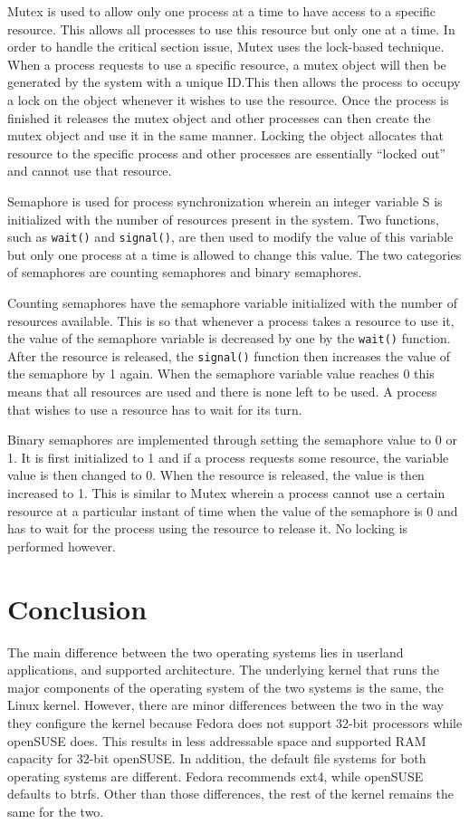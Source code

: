 \documentclass{article}
\begin{document}
Mutex is used to allow only one process at a time to have access to a specific
resource. This allows all processes to use this resource but only one at a time.
In order to handle the critical section issue, Mutex uses the lock-based
technique. When a process requests to use a specific resource, a mutex object
will then be generated by the system with a unique ID.\@ This then allows the
process to occupy a lock on the object whenever it wishes to use the resource.
Once the process is finished it releases the mutex object and other processes
can then create the mutex object and use it in the same manner. Locking the
object allocates that resource to the specific process and other processes are
essentially “locked out” and cannot use that resource.

Semaphore is used for process synchronization wherein an integer variable S is
initialized with the number of resources present in the system. Two functions,
such as \texttt{wait()} and \texttt{signal()}, are then used to modify the value
of this variable but only one process at a time is allowed to change this value.
The two categories of semaphores are counting semaphores and binary semaphores.

Counting semaphores have the semaphore variable initialized with the number of
resources available. This is so that whenever a process takes a resource to use
it, the value of the semaphore variable is decreased by one by the
\texttt{wait()} function. After the resource is released, the \texttt{signal()}
function then increases the value of the semaphore by 1 again. When the
semaphore variable value reaches 0 this means that all resources are used and
there is none left to be used. A process that wishes to use a resource has to
wait for its turn.

Binary semaphores are implemented through setting the semaphore value to 0 or 1.
It is first initialized to 1 and if a process requests some resource, the
variable value is then changed to 0. When the resource is released, the value is
then increased to 1. This is similar to Mutex wherein a process cannot use a
certain resource at a particular instant of time when the value of the semaphore
is 0 and has to wait for the process using the resource to release it. No
locking is performed however. \parencite{concurrency}

\section{Conclusion}
The main difference between the two operating systems lies in userland
applications, and supported architecture. The underlying kernel that runs the
major components of the operating system of the two systems is the same, the
Linux kernel. However, there are minor differences between the two in the way
they configure the kernel because Fedora does not support 32-bit processors
while openSUSE does. This results in less addressable space and supported RAM
capacity for 32-bit openSUSE. In addition, the default file systems for both
operating systems are different. Fedora recommends ext4, while openSUSE defaults
to btrfs. Other than those differences, the rest of the kernel remains the same
for the two.
\end{document}
